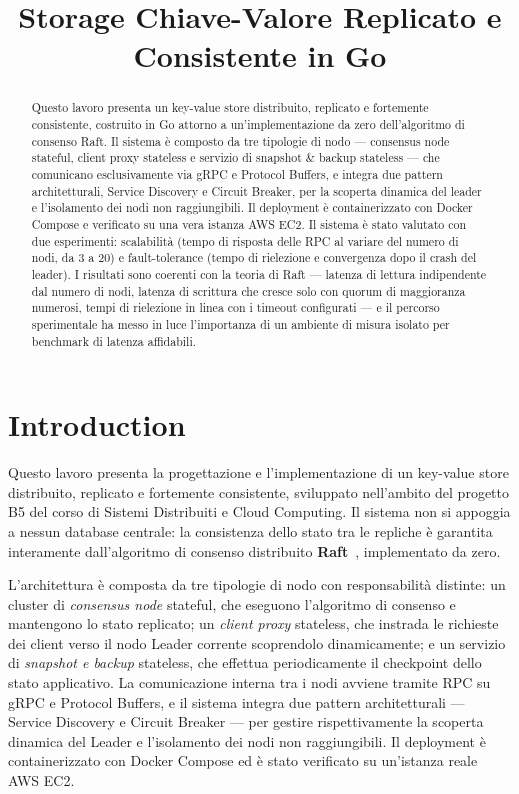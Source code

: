 \documentclass[conference]{IEEEtran}
\title{Storage Chiave-Valore Replicato e Consistente in Go}
\author{
\IEEEauthorblockN{Federico Cola}
\IEEEauthorblockA{
Corso di Sistemi Distribuiti e Cloud Computing\\
Universit\`a degli Studi di Roma ``Tor Vergata''\\
Email: federicola00@gmail.com}
}
\begin{document}
\maketitle

\begin{abstract}
Questo lavoro presenta un key-value store distribuito, replicato e
fortemente consistente, costruito in Go attorno a un'implementazione da
zero dell'algoritmo di consenso Raft. Il sistema è composto da tre
tipologie di nodo — consensus node stateful, client proxy stateless e
servizio di snapshot \& backup stateless — che comunicano esclusivamente
via gRPC e Protocol Buffers, e integra due pattern architetturali, Service
Discovery e Circuit Breaker, per la scoperta dinamica del leader e
l'isolamento dei nodi non raggiungibili. Il deployment è containerizzato
con Docker Compose e verificato su una vera istanza AWS EC2. Il sistema è
stato valutato con due esperimenti: scalabilità (tempo di risposta delle
RPC al variare del numero di nodi, da 3 a 20) e fault-tolerance (tempo di
rielezione e convergenza dopo il crash del leader). I risultati sono
coerenti con la teoria di Raft — latenza di lettura indipendente dal
numero di nodi, latenza di scrittura che cresce solo con quorum di
maggioranza numerosi, tempi di rielezione in linea con i timeout
configurati — e il percorso sperimentale ha messo in luce l'importanza di
un ambiente di misura isolato per benchmark di latenza affidabili.
\end{abstract}

\section{Introduction}

Questo lavoro presenta la progettazione e l'implementazione di un
key-value store distribuito, replicato e fortemente consistente,
sviluppato nell'ambito del progetto B5 del corso di Sistemi Distribuiti e
Cloud Computing. Il sistema non si appoggia a nessun database centrale:
la consistenza dello stato tra le repliche è garantita interamente
dall'algoritmo di consenso distribuito \textbf{Raft}~\cite{ongaro2014raft},
implementato da zero.

L'architettura è composta da tre tipologie di nodo con responsabilità
distinte: un cluster di \emph{consensus node} stateful, che eseguono
l'algoritmo di consenso e mantengono lo stato replicato; un
\emph{client proxy} stateless, che instrada le richieste dei client verso
il nodo Leader corrente scoprendolo dinamicamente; e un servizio di
\emph{snapshot e backup} stateless, che effettua periodicamente il
checkpoint dello stato applicativo. La comunicazione interna tra i nodi
avviene tramite RPC su gRPC e Protocol Buffers, e il sistema integra due
pattern architetturali — Service Discovery e Circuit Breaker — per
gestire rispettivamente la scoperta dinamica del Leader e l'isolamento
dei nodi non raggiungibili. Il deployment è containerizzato con Docker
Compose ed è stato verificato su un'istanza reale AWS EC2.
\end{document}
